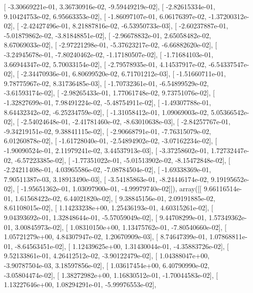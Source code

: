 \documentclass{article}
\begin{document}
       [ -3.30669221e-01,   3.36730916e-02,  -9.59449219e-02],
       [ -2.82615334e-01,   9.10424753e-02,   6.95663353e-02],
       [ -1.86097107e-01,   6.06176397e-02,  -1.37200312e-02],
       [ -2.42427496e-01,   8.21887816e-02,  -6.53950733e-03],
       [ -2.60237887e-01,  -5.01879862e-02,  -3.81848851e-02],
       [ -2.96678832e-01,   2.65058482e-02,   8.67069033e-02],
       [ -2.97221298e-01,  -5.37623217e-02,  -6.66882620e-02],
       [ -3.24945678e-01,  -7.80240462e-02,  -1.17180507e-02],
       [ -1.71684103e-01,   3.66944347e-02,   5.70033154e-02],
       [ -2.79578935e-01,   4.14537917e-02,  -6.54337547e-02],
       [ -2.34470936e-01,   6.80699520e-02,   6.71701212e-03],
       [ -1.51660711e-01,   9.78775967e-02,   8.31736485e-03],
       [ -1.70732361e-01,  -6.54899529e-02,  -3.61593174e-02],
       [ -2.98265433e-01,   1.77061748e-02,   9.73751076e-02],
       [ -1.32827699e-01,   7.98491224e-02,  -5.48754911e-02],
       [ -1.49307788e-01,   8.64432342e-02,  -6.25234759e-02],
       [ -1.31058412e-01,   1.09069003e-02,   5.05366542e-02],
       [ -2.54024648e-01,  -2.41781460e-02,  -8.63010638e-03],
       [ -2.84257767e-01,  -9.34219151e-02,   9.38841115e-02],
       [ -2.90668791e-01,  -7.76315079e-02,   6.01260878e-02],
       [ -1.61728040e-01,  -2.54894902e-02,  -3.07162234e-02],
       [ -1.90090524e-01,   2.11979241e-02,   3.44537913e-03],
       [ -3.37258602e-01,   1.72732447e-02,  -6.57223385e-02],
       [ -1.77351022e-01,  -5.01513902e-02,  -8.15472848e-02],
       [ -2.24211408e-01,   4.03965586e-02,  -7.08784504e-02],
       [ -1.69338369e-01,   7.90511387e-03,   3.18913490e-03],
       [ -3.54185863e-01,  -8.24446174e-02,   9.19195652e-02],
       [ -1.95651362e-01,   1.03097900e-01,  -4.99979740e-02]]), array([[  9.66116514e-01,   1.61568422e-02,   6.44021820e-02],
       [  9.38845156e-01,   2.09191885e-02,   8.61108015e-02],
       [  1.14233238e+00,   1.25436193e-01,   4.60315261e-02],
       [  9.04393692e-01,   1.32848644e-01,  -5.57059049e-02],
       [  9.44708299e-01,   1.57349362e-01,   3.00845973e-02],
       [  1.08310150e+00,   1.13475762e-01,  -7.80540660e-02],
       [  1.05721279e+00,   4.84307947e-02,   1.20670909e-03],
       [  8.74647399e-01,   1.07868811e-01,  -8.64563451e-02],
       [  1.12439625e+00,   1.31430044e-01,  -4.35883726e-02],
       [  9.52133861e-01,   4.26412512e-02,  -3.90122479e-02],
       [  1.04388047e+00,  -3.90787504e-03,   3.18597856e-02],
       [  1.03617454e+00,   6.40790990e-02,  -3.05804474e-02],
       [  1.38272982e+00,   1.16830512e-01,  -1.70044583e-02],
       [  1.13227646e+00,   1.08294291e-01,  -5.99976553e-02],
\end{document}
